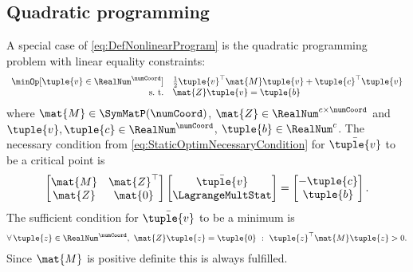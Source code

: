 \subsection{Quadratic programming}\label{sec:QuadraticProgramming}
A special case of \eqref{eq:DefNonlinearProgram} is the quadratic programming problem with linear equality constraints:
\begin{align}
 \begin{array}{rl}
  \minOp[\tuple{v}\in\RealNum^\numCoord] & \tfrac{1}{2} \tuple{v}^\top \mat{M} \tuple{v} + \tuple{c}^\top \tuple{v} \\
  \text{s.\ t.} & \mat{Z} \tuple{v} = \tuple{b}
 \end{array}
\end{align}
where $\mat{M} \in \SymMatP(\numCoord)$, $\mat{Z} \in \RealNum^{c\times\numCoord}$ and $\tuple{v},\tuple{c}\in\RealNum^{\numCoord}$, $ \tuple{b} \in \RealNum^{c}$.
The necessary condition from \eqref{eq:StaticOptimNecessaryCondition} for $\bar{\tuple{v}}$ to be a critical point is
\begin{align}\label{eq:BlubbEq}
 \begin{bmatrix} \mat{M} & \mat{Z}^\top \\ \mat{Z} & \mat{0} \end{bmatrix}
 \begin{bmatrix} \bar{\tuple{v}} \\ \LagrangeMultStat \end{bmatrix}
 = \begin{bmatrix} -\tuple{c} \\ \tuple{b} \end{bmatrix}.
\end{align}
The sufficient condition for $\bar{\tuple{v}}$ to be a minimum is
\begin{align}
 \forall\,\tuple{z}\in\RealNum^{\numCoord}, \ \mat{Z} \tuple{z} = \tuple{0} \ : \ \tuple{z}^\top \mat{M} \tuple{z} > 0.
\end{align}
Since $\mat{M}$ is positive definite this is always fulfilled.

